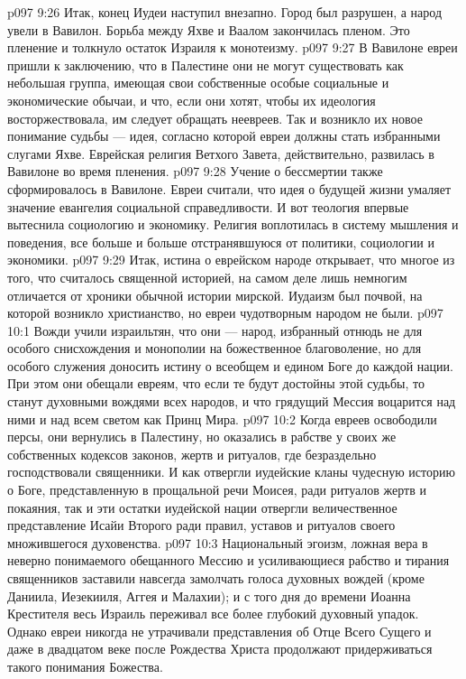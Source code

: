 \vs p097 9:26 Итак, конец Иудеи наступил внезапно. Город был разрушен, а народ увели в Вавилон. Борьба между Яхве и Ваалом закончилась пленом. Это пленение и толкнуло остаток Израиля к монотеизму.
\vs p097 9:27 \pc В Вавилоне евреи пришли к заключению, что в Палестине они не могут существовать как небольшая группа, имеющая свои собственные особые социальные и экономические обычаи, и что, если они хотят, чтобы их идеология восторжествовала, им следует обращать неевреев. Так и возникло их новое понимание судьбы --- идея, согласно которой евреи должны стать избранными слугами Яхве. Еврейская религия Ветхого Завета, действительно, развилась в Вавилоне во время пленения.
\vs p097 9:28 Учение о бессмертии также сформировалось в Вавилоне. Евреи считали, что идея о будущей жизни умаляет значение евангелия социальной справедливости. И вот теология впервые вытеснила социологию и экономику. Религия воплотилась в систему мышления и поведения, все больше и больше отстранявшуюся от политики, социологии и экономики.
\vs p097 9:29 \pc Итак, истина о еврейском народе открывает, что многое из того, что считалось священной историей, на самом деле лишь немногим отличается от хроники обычной истории мирской. Иудаизм был почвой, на которой возникло христианство, но евреи чудотворным народом не были.
\vs p097 10:1 Вожди учили израильтян, что они --- народ, избранный отнюдь не для особого снисхождения и монополии на божественное благоволение, но для особого служения доносить истину о всеобщем и едином Боге до каждой нации. При этом они обещали евреям, что если те будут достойны этой судьбы, то станут духовными вождями всех народов, и что грядущий Мессия воцарится над ними и над всем светом как Принц Мира.
\vs p097 10:2 Когда евреев освободили персы, они вернулись в Палестину, но оказались в рабстве у своих же собственных кодексов законов, жертв и ритуалов, где безраздельно господствовали священники. И как отвергли иудейские кланы чудесную историю о Боге, представленную в прощальной речи Моисея, ради ритуалов жертв и покаяния, так и эти остатки иудейской нации отвергли величественное представление Исайи Второго ради правил, уставов и ритуалов своего множившегося духовенства.
\vs p097 10:3 Национальный эгоизм, ложная вера в неверно понимаемого обещанного Мессию и усиливающиеся рабство и тирания священников заставили навсегда замолчать голоса духовных вождей (кроме Даниила, Иезекииля, Аггея и Малахии); и с того дня до времени Иоанна Крестителя весь Израиль переживал все более глубокий духовный упадок. Однако евреи никогда не утрачивали представления об Отце Всего Сущего и даже в двадцатом веке после Рождества Христа продолжают придерживаться такого понимания Божества.
